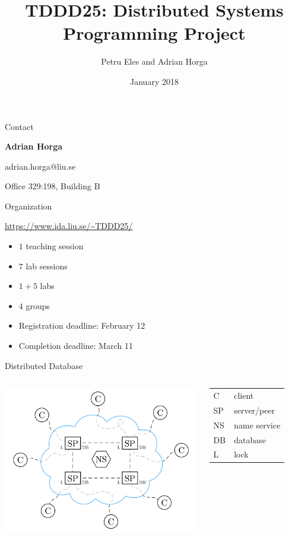 \documentclass[compress,xcolor=table]{beamer}
\title{%
  TDDD25: Distributed Systems\\%
  \vspace{0.1em}%
  Programming Project%
}
\author{Petru Eles and Adrian Horga}
\date{January 2018}
\institute[Link\"oping University]{
  Computer and Information Science\\
  Link\"oping University
}
\begin{document}
\frame[plain]{\titlepage}

\begin{frame}{Contact}
\begin{center}
  \textbf{Adrian Horga}

  adrian.horga@liu.se

  Office 329:198, Building B

\end{center}
\end{frame}

\begin{frame}{Organization}
  \begin{center}
    \url{https://www.ida.liu.se/~TDDD25/}
  \end{center}
  \begin{itemize}
    \item $1$ teaching session
    \item $7$ lab sessions
    \item $1 + 5$ labs
    \item $4$ groups
    \item Registration deadline: February 12
    \item Completion deadline: March 11
  \end{itemize}
\end{frame}

\begin{frame}{Distributed Database}
\begin{columns}
  \column{7cm}
  \centering
  \includegraphics[scale=0.14,page=1]{include/assets/distributed-database}
  \column{3cm}
  \begin{tabular}{l @{ --- } l}
    \alert{C}  & client \\
    \alert{SP} & server/peer \\
    \alert{NS} & name service \\
    \alert{DB} & database \\
    \alert{L}  & lock
  \end{tabular}
\end{columns}
\end{frame}
\end{document}
